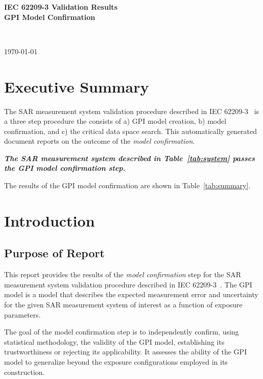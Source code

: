 \documentclass{article}
\begin{document}
\flushright
\begin{Large}
\textbf{IEC 62209-3 Validation Results} \\
\vspace{3pt}
\textbf{GPI Model Confirmation}
\end{Large} \\
\begin{small}
\today \\ \currenttime
\end{small}
\flushleft

\section{Executive Summary}\label{sec:exec_summary}
The SAR measurement system validation procedure described in IEC 62209-3~\cite{standard} is a three step procedure the consists of a) GPI model creation, b) model confirmation, and c) the critical data space search. This automatically generated document reports on the outcome of the \textit{model confirmation}.

\textbf{\textit{The SAR measurement system described in Table~\ref{tab:system} passes the GPI model confirmation step.}}

The results of the GPI model confirmation are shown in Table~\ref{tab:summary}.





\section{Introduction}\label{sec:start}

\subsection{Purpose of Report}\label{sec:intro}

This report provides the results of the \textit{model confirmation} step for the SAR measurement system validation procedure described in IEC 62209-3~\cite{standard}. The GPI model is a model that describes the expected measurement error and uncertainty for the given SAR measurement system of interest as a function of exposure parameters.

The goal of the model confirmation step is to independently confirm, using statistical methodology, the validity of the GPI model, establishing its trustworthiness or rejecting its applicability. It assesses the ability of the GPI model to generalize beyond the exposure configurations employed in its construction.
\end{document}
